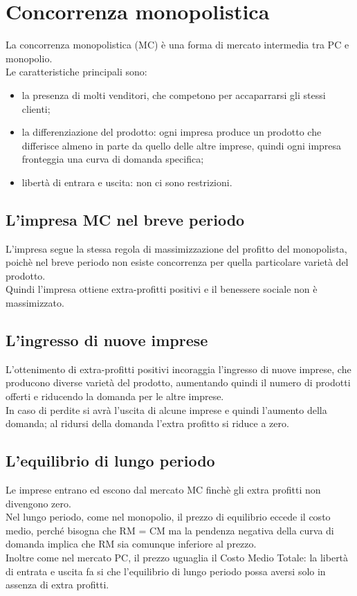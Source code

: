 \documentclass{report}
\begin{document}
	\section{Concorrenza monopolistica}
	La concorrenza monopolistica (MC) è una forma di mercato intermedia tra PC e monopolio.
	\medskip \\Le caratteristiche principali sono:
	\begin{itemize}
		\item la presenza di molti venditori, che competono per accaparrarsi gli stessi clienti;
		\item la differenziazione del prodotto: ogni impresa produce un prodotto che differisce almeno in parte da quello delle altre imprese, quindi ogni impresa fronteggia una curva di domanda specifica;
		\item libertà di entrara e uscita: non ci sono restrizioni.
	\end{itemize}
	\subsection{L'impresa MC nel breve periodo}
	L'impresa segue la stessa regola di massimizzazione del profitto del monopolista, poichè nel breve periodo non esiste concorrenza per quella particolare varietà del prodotto.
	\medskip \\Quindi l'impresa ottiene extra-profitti positivi e il benessere sociale non è massimizzato.
	\subsection{L'ingresso di nuove imprese}
	L'ottenimento di extra-profitti positivi incoraggia l'ingresso di nuove imprese, che producono diverse varietà del prodotto, aumentando quindi il numero di prodotti offerti e riducendo la domanda per le altre imprese.\medskip \\In caso di perdite si avrà l'uscita di alcune imprese e quindi l'aumento della domanda; al ridursi della domanda l'extra profitto si riduce a zero.
	\subsection{L'equilibrio di lungo periodo}
	Le imprese entrano ed escono dal mercato MC finchè gli extra profitti non divengono zero.\medskip \\
	Nel lungo periodo, come nel monopolio, il prezzo di equilibrio eccede il costo medio, perché bisogna che RM = CM ma la pendenza negativa della curva di domanda implica che RM sia comunque inferiore al prezzo.\medskip \\Inoltre come nel mercato PC, il prezzo uguaglia il Costo Medio Totale: la libertà di entrata e uscita fa si che l'equilibrio di lungo periodo possa aversi solo in assenza di extra profitti.
\end{document}
